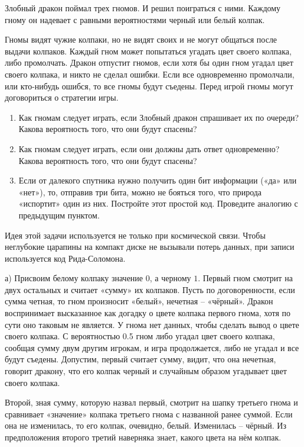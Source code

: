 \documentclass[nobib]{tufte-handout}
\theoremstyle{definition}
\newcounter{problem}
\newenvironment{problem}%
{%
\refstepcounter{problem}%
     \hypertarget{problem:{\theproblem}}{}
     \Writetofile{solution_file}{\protect\hypertarget{soln:\theproblem}{}}
     \begin{myenum}[label=\bfseries\protect\hyperlink{soln:\theproblem}{\theproblem},ref=\theproblem]
     \item%
    }%
    {%
    \end{myenum}}
\begin{document}
\begin{problem}
Злобный дракон поймал трех гномов. И решил поиграться с ними. Каждому гному он надевает с равными вероятностями черный или белый колпак.


Гномы видят чужие колпаки, но не видят своих и не могут общаться после выдачи колпаков. Каждый гном может попытаться угадать цвет своего колпака, либо промолчать. Дракон отпустит гномов, если хотя бы один гном угадал цвет своего колпака, и никто не сделал ошибки. Если все одновременно промолчали, или кто-нибудь ошибся, то все гномы будут съедены. Перед игрой гномы могут договориться о стратегии игры.
\begin{enumerate}
\item Как гномам следует играть, если Злобный дракон спрашивает их по очереди? Какова вероятность того, что они будут спасены?
\item Как гномам следует играть, если они должны дать ответ одновременно? Какова вероятность того, что они будут спасены?
\item Если от далекого спутника нужно получить один бит информации («да» или «нет»), то, отправив три бита, можно не бояться того, что природа «испортит» один из них. Постройте этот простой код. Проведите аналогию с предыдущим пунктом. 
\end{enumerate}
Идея этой задачи используется не только при космической связи. Чтобы неглубокие царапины на компакт диске не вызывали потерь данных, при записи используется код Рида-Соломона.

\begin{sol}
а) Присвоим белому колпаку значение $0$, а черному $1$. Первый гном смотрит на двух остальных и считает «сумму» их колпаков. Пусть по договоренности, если сумма четная, то гном произносит «белый», нечетная – «чёрный». Дракон воспринимает высказанное как догадку о цвете колпака первого гнома, хотя по сути оно таковым не является. У гнома нет данных, чтобы сделать вывод о цвете своего колпака. С вероятностью 0.5 гном либо угадал цвет своего колпака, сообщая сумму двум другим игрокам, и игра продолжается, либо не угадал и все будут съедены. Допустим, первый считает сумму, видит, что она нечетная, говорит дракону, что его колпак черный и случайным образом угадывает цвет своего колпака.

Второй, зная сумму, которую назвал первый, смотрит на шапку третьего гнома и сравнивает «значение» колпака третьего гнома с названной ранее суммой. Если она не изменилась, то его колпак, очевидно, белый. Изменилась – чёрный. Из предположения второго третий наверняка знает, какого цвета на нём колпак.


\end{sol}
\end{problem}
\end{document}
